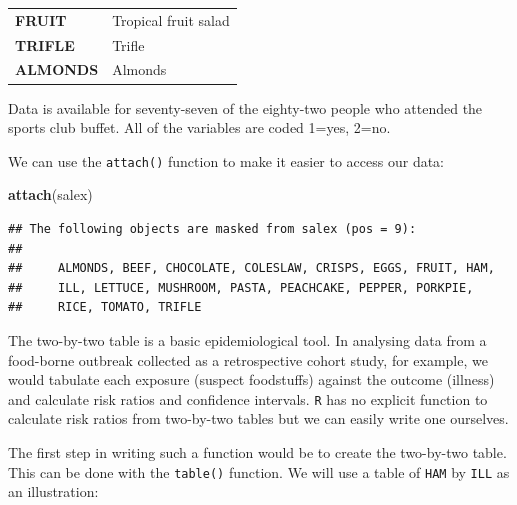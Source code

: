 \documentclass[]{book}
\newenvironment{Shaded}{\begin{snugshade}}{\end{snugshade}}
\newcommand{\KeywordTok}[1]{\textcolor[rgb]{0.13,0.29,0.53}{\textbf{#1}}}
\newcommand{\NormalTok}[1]{#1}
\theoremstyle{definition}
\theoremstyle{definition}
\theoremstyle{definition}
\theoremstyle{remark}
\begin{document}
\begin{longtable}[]{@{}ll@{}}
\begin{minipage}[t]{0.21\columnwidth}\raggedright
\textbf{FRUIT}\strut
\end{minipage} & \begin{minipage}[t]{0.30\columnwidth}\raggedright
Tropical fruit salad\strut
\end{minipage}\tabularnewline
\begin{minipage}[t]{0.21\columnwidth}\raggedright
\textbf{TRIFLE}\strut
\end{minipage} & \begin{minipage}[t]{0.30\columnwidth}\raggedright
Trifle\strut
\end{minipage}\tabularnewline
\begin{minipage}[t]{0.21\columnwidth}\raggedright
\textbf{ALMONDS}\strut
\end{minipage} & \begin{minipage}[t]{0.30\columnwidth}\raggedright
Almonds\strut
\end{minipage}\tabularnewline
\bottomrule
\end{longtable}

Data is available for seventy-seven of the eighty-two people who
attended the sports club buffet. All of the variables are coded 1=yes,
2=no.

We can use the \texttt{attach()} function to make it easier to access
our data:

\begin{Shaded}
\begin{Highlighting}[]
\KeywordTok{attach}\NormalTok{(salex)}
\end{Highlighting}
\end{Shaded}

\begin{verbatim}
## The following objects are masked from salex (pos = 9):
## 
##     ALMONDS, BEEF, CHOCOLATE, COLESLAW, CRISPS, EGGS, FRUIT, HAM,
##     ILL, LETTUCE, MUSHROOM, PASTA, PEACHCAKE, PEPPER, PORKPIE,
##     RICE, TOMATO, TRIFLE
\end{verbatim}

The two-by-two table is a basic epidemiological tool. In analysing data
from a food-borne outbreak collected as a retrospective cohort study,
for example, we would tabulate each exposure (suspect foodstuffs)
against the outcome (illness) and calculate risk ratios and confidence
intervals. \texttt{R} has no explicit function to calculate risk ratios
from two-by-two tables but we can easily write one ourselves.

The first step in writing such a function would be to create the
two-by-two table. This can be done with the \texttt{table()} function.
We will use a table of \texttt{HAM} by \texttt{ILL} as an illustration:
\end{document}
